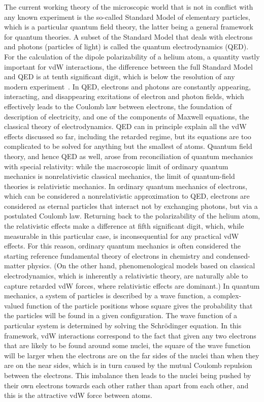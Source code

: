 The current working theory of the microscopic world that is not in conflict with any known experiment is the so-called Standard Model of elementary particles, which is a particular quantum field theory, the latter being a general framework for quantum theories.
A subset of the Standard Model that deals with electrons and photons (particles of light) is called the quantum electrodynamics (QED).
For the calculation of the dipole polarizability of a helium atom, a quantity vastly important for vdW interactions, the difference between the full Standard Model and QED is at tenth significant digit, which is below the resolution of any modern experiment~\cite[see][Table 3.1]{Piela07}.
In QED, electrons and photons are constantly appearing, interacting, and disappearing excitations of electron and photon fields, which effectively leads to the Coulomb law between electrons, the foundation of description of electricity, and one of the components of Maxwell equations, the classical theory of electrodynamics.
QED can in principle explain all the vdW effects discussed so far, including the retarded regime, but its equations are too complicated to be solved for anything but the smallest of atoms.
Quantum field theory, and hence QED as well, arose from reconciliation of quantum mechanics with special relativity: while the macroscopic limit of ordinary quantum mechanics is nonrelativistic classical mechanics, the limit of quantum-field theories is relativistic mechanics.
In ordinary quantum mechanics of electrons, which can be considered a nonrelativistic approximation to QED, electrons are considered as eternal particles that interact not by exchanging photons, but via a postulated Coulomb law.
Returning back to the polarizability of the helium atom, the relativistic effects make a difference at fifth significant digit, which, while measurable in this particular case, is inconsequential for any practical vdW effects.
For this reason, ordinary quantum mechanics is often considered the starting reference fundamental theory of electrons in chemistry and condensed-matter physics.
(On the other hand, phenomenological models based on classical electrodynamics, which is inherently a relativistic theory, are naturally able to capture retarded vdW forces, where relativistic effects are dominant.)
In quantum mechanics, a system of particles is described by a wave function, a complex-valued function of the particle positions whose square gives the probability that the particles will be found in a given configuration.
The wave function of a particular system is determined by solving the Schrödinger equation.
In this framework, vdW interactions correspond to the fact that given any two electrons that are likely to be found around some nuclei, the square of the wave function will be larger when the electrons are on the far sides of the nuclei than when they are on the near sides, which is in turn caused by the mutual Coulomb repulsion between the electrons.
This imbalance then leads to the nuclei being pushed by their own electrons towards each other rather than apart from each other, and this is the attractive vdW force between atoms.

